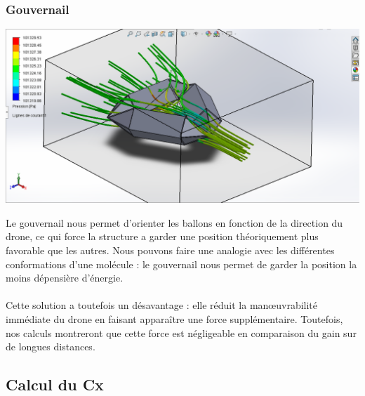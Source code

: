 \documentclass[a4paper,11pt]{article}
\begin{document}
\subsubsection{Gouvernail}
	\begin{center}
		\includegraphics[width=14cm]{../Images/Capture.PNG}
	\end{center}
	Le gouvernail nous permet d'orienter les ballons en fonction de la direction du drone, ce qui force la structure a garder une position théoriquement plus favorable que les autres.
	Nous pouvons faire une analogie avec les différentes conformations d'une molécule : le gouvernail nous permet de garder la position la moins dépensière d'énergie.\\
	\\
  Cette solution a toutefois un désavantage : elle réduit la manœuvrabilité immédiate du drone en faisant apparaître une force supplémentaire. Toutefois, nos calculs montreront que cette force est négligeable en comparaison du gain sur de longues distances.


\subsection{Calcul du Cx}
\end{document}

